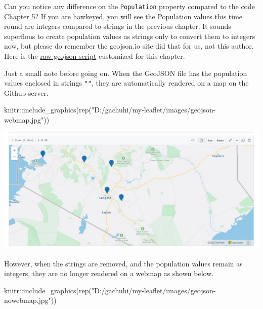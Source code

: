 \documentclass[
]{book}
\newenvironment{Shaded}{\begin{snugshade}}{\end{snugshade}}
\newcommand{\FunctionTok}[1]{\textcolor[rgb]{0.00,0.00,0.00}{#1}}
\newcommand{\NormalTok}[1]{#1}
\newcommand{\SpecialCharTok}[1]{\textcolor[rgb]{0.00,0.00,0.00}{#1}}
\newcommand{\StringTok}[1]{\textcolor[rgb]{0.31,0.60,0.02}{#1}}
\begin{document}
Can you notice any difference on the \texttt{Population} property compared to the code \protect\hyperlink{using-geojson-in-leaflet}{Chapter 5}? If you are hawkeyed, you will see the Population values this time round are integers compared to strings in the previous chapter. It sounds superflous to create population values as strings only to convert them to integers now, but please do remember the geojson.io site did that for us, not this author. Here is the \href{https://raw.githubusercontent.com/sammigachuhi/geojson_files/main/cities-geojson2.geojson.txt}{raw geojson script} customized for this chapter.

Just a small note before going on. When the GeoJSON file has the population values enclosed in strings \texttt{""}, they are automatically rendered on a map on the Github server.

\begin{Shaded}
\begin{Highlighting}[]
\NormalTok{knitr}\SpecialCharTok{::}\FunctionTok{include\_graphics}\NormalTok{(}\FunctionTok{rep}\NormalTok{(}\StringTok{"D:/gachuhi/my{-}leaflet/images/geojson{-}webmap.jpg"}\NormalTok{))}
\end{Highlighting}
\end{Shaded}

\includegraphics[width=21.97in]{../images/geojson-webmap}

However, when the strings are removed, and the population values remain as integers, they are no longer rendered on a webmap as shown below.

\begin{Shaded}
\begin{Highlighting}[]
\NormalTok{knitr}\SpecialCharTok{::}\FunctionTok{include\_graphics}\NormalTok{(}\FunctionTok{rep}\NormalTok{(}\StringTok{"D:/gachuhi/my{-}leaflet/images/geojson{-}nowebmap.jpg"}\NormalTok{))}
\end{Highlighting}
\end{Shaded}
\end{document}
